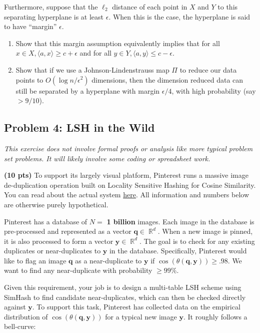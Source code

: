 \documentclass[10pt]{article}
\DeclareMathOperator{\R}{\mathbb{R}}
\newcommand{\bv}[1]{\mathbf{#1}}
\begin{document}
Furthermore, suppose that the $\ell_2$ distance of each point in $X$ and $Y$ to this separating hyperplane is at least $\epsilon$. When this is the case, the hyperplane is said to have ``margin'' $\epsilon$. 

\begin{enumerate}
	\item Show that this margin assumption equivalently implies that for all $x\in X, \langle a, x\rangle \geq c + \epsilon$ and for all $y\in Y, \langle a, y\rangle \leq c - \epsilon$.
	
	\item Show that if we use a Johnson-Lindenstrauss map $\Pi$ to reduce our data points to $O(\log n/\epsilon^2)$ dimensions, then the dimension reduced data can still be separated by a hyperplane with margin $\epsilon/4$, with high probability (say $> 9/10$).
\end{enumerate}

\subsection{Problem 4: LSH in the Wild} 
\textit{This exercise does not involve formal proofs or analysis like more typical problem set problems. It will likely involve some coding or spreadsheet work.}
\vspace{.25em}

\noindent\textbf{(10 pts)}
To support its largely visual platform, Pinterest runs a massive image de-duplication operation built on Locality Sensitive Hashing for Cosine Similarity. You can read about the actual system \href{https://medium.com/pinterest-engineering/detecting-image-similarity-using-spark-lsh-and-tensorflow-618636afc939}{here}. All information and numbers below are otherwise purely hypothetical.

Pinterest has a database of $N = $ \textbf{1 billion} images. Each image in the database is pre-processed and represented as a vector $\bv{q}\in \R^d$. When a new image is pinned, it is also processed to form a vector $\bv{y} \in \R^d$. The goal is to check for any existing duplicates or near-duplicates to $\bv{y}$ in the database.  
Specifically, Pinterest would like to flag an image $\bv{q}$ as a near-duplicate to $\bv{y}$ if $\cos(\theta(\bv{q},\bv{y})) \geq .98$. We want to find any near-duplicate with probability $\geq 99\%$. 

Given this requirement, your job is to design a multi-table LSH scheme using SimHash to find candidate near-duplicates, which can then be checked directly against $\bv{y}$. To support this task, Pinterest has collected data on the empirical distribution of $\cos(\theta(\bv{q},\bv{y}))$ for a typical new image $\bv{y}$. It roughly follows a bell-curve:
\end{document}
